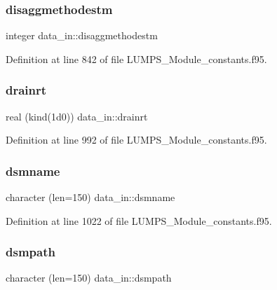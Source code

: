 \mbox{\label{namespacedata__in_a672fba472da09ab270c02ec3e92ff9a3}} 
\subsubsection{\texorpdfstring{disaggmethodestm}{disaggmethodestm}}
{\footnotesize\ttfamily integer data\+\_\+in\+::disaggmethodestm}



Definition at line 842 of file L\+U\+M\+P\+S\+\_\+\+Module\+\_\+constants.\+f95.

\mbox{\label{namespacedata__in_abc838b310998f8cef4246fd9d724e903}} 
\subsubsection{\texorpdfstring{drainrt}{drainrt}}
{\footnotesize\ttfamily real (kind(1d0)) data\+\_\+in\+::drainrt}



Definition at line 992 of file L\+U\+M\+P\+S\+\_\+\+Module\+\_\+constants.\+f95.

\mbox{\label{namespacedata__in_a1d1b3d576c2ec06ca44f4ce7bbcd7532}} 
\subsubsection{\texorpdfstring{dsmname}{dsmname}}
{\footnotesize\ttfamily character (len=150) data\+\_\+in\+::dsmname}



Definition at line 1022 of file L\+U\+M\+P\+S\+\_\+\+Module\+\_\+constants.\+f95.

\mbox{\label{namespacedata__in_a682487b527aac38b57ec89a935d5c4bc}} 
\subsubsection{\texorpdfstring{dsmpath}{dsmpath}}
{\footnotesize\ttfamily character (len=150) data\+\_\+in\+::dsmpath}



